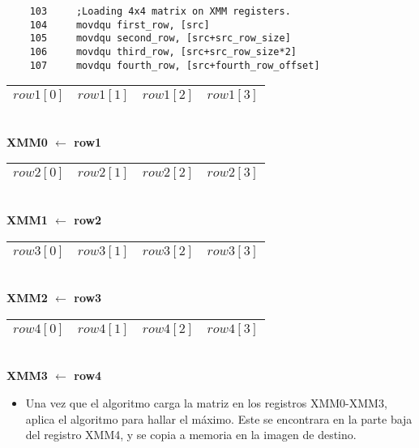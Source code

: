 \begin{codesnippet}
  \begin{verbatim}
	103		;Loading 4x4 matrix on XMM registers.
	104		movdqu first_row, [src]
	105		movdqu second_row, [src+src_row_size]
	106		movdqu third_row, [src+src_row_size*2]
	107		movdqu fourth_row, [src+fourth_row_offset]
  \end{verbatim}
\end{codesnippet}

\begin{center}
  \begin{tabular}{|c || c || c || c |}
  \hline
  $row1[0]$ & $row1[1]$ & $row1[2]$ & $row1[3]$ \\ \hline
  \end{tabular}
  \\ \textbf{XMM0 $\gets$ row1}
\end{center}
\begin{center}
  \begin{tabular}{|c || c || c || c |}
  \hline
  $row2[0]$ & $row2[1]$ & $row2[2]$ & $row2[3]$ \\ \hline
  \end{tabular}
  \\ \textbf{XMM1 $\gets$ row2}
\end{center}
\begin{center}
  \begin{tabular}{|c || c || c || c |}
  \hline
  $row3[0]$ & $row3[1]$ & $row3[2]$ & $row3[3]$ \\ \hline
  \end{tabular}
  \\ \textbf{XMM2 $\gets$ row3}
\end{center}
\begin{center}
  \begin{tabular}{|c || c || c || c |}
  \hline
  $row4[0]$ & $row4[1]$ & $row4[2]$ & $row4[3]$ \\ \hline
  \end{tabular}
  \\ \textbf{XMM3 $\gets$ row4}
\end{center}

\begin{itemize}
\item Una vez que el algoritmo carga la matriz en los registros XMM0-XMM3, aplica el algoritmo para hallar el máximo. Este se encontrara en la parte baja del registro XMM4, y se copia a memoria en la imagen de destino.
\end{itemize}

